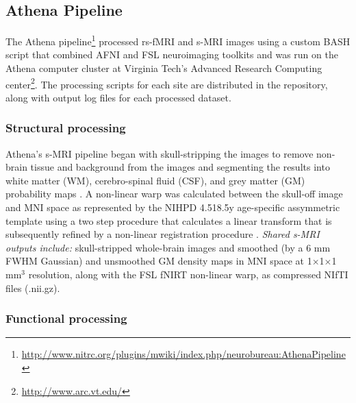 \documentclass[preprint,12pt,3p]{elsarticle}
\begin{document}
\subsection{Athena Pipeline} 
The Athena pipeline\footnote{\url{http://www.nitrc.org/plugins/mwiki/index.php/neurobureau:AthenaPipeline}} processed rs-fMRI and s-MRI images using a custom BASH script that combined AFNI \cite{cox1996afni} and FSL \cite{smith2004advances} neuroimaging toolkits and was run on the Athena computer cluster at Virginia Tech's Advanced Research Computing center\footnote{\url{http://www.arc.vt.edu/}}. The processing scripts for each site are distributed in the repository, along with output log files for each processed dataset.

\subsubsection{Structural processing} Athena's s-MRI pipeline began with skull-stripping the images to remove non-brain tissue and background from the images \cite{smith2002_bet} and segmenting the results into white matter (WM), cerebro-spinal fluid (CSF), and grey matter (GM) probability maps \cite{zhang2001_fast}. A non-linear warp was calculated between the skull-off image and MNI space as represented by the NIHPD 4.5\textendash18.5y age-specific assymmetric template \cite{fonov2011unbiased} using a two step procedure that calculates a linear transform \cite{jenkinson2002_flirt} that is subsequently refined by a non-linear registration procedure \cite{andersson2007non}. \emph{Shared s-MRI outputs include:} skull-stripped whole-brain images and smoothed (by a 6 mm FWHM Gaussian) and unsmoothed GM density maps in MNI space at 1$\times$1$\times$1 mm$^3$ resolution, along with the FSL fNIRT non-linear warp, as compressed NIfTI files (.nii.gz). 

\subsubsection{Functional processing} 
\end{document}
